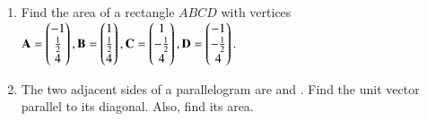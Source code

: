 \begin{enumerate}[label=\arabic*.,ref=\thesubsection.\theenumi]
\item Find the area of a rectangle $ABCD$ with vertices
$\mathbf{A} = \begin{pmatrix}-1\\\frac{1}{2}\\ 4\end{pmatrix},
 \mathbf{B} = \begin{pmatrix}1\\\frac{1}{2}\\ 4\end{pmatrix},
\mathbf{C} = \begin{pmatrix}1\\-\frac{1}{2}\\ 4\end{pmatrix},
\mathbf{D} = \begin{pmatrix}-1\\-\frac{1}{2}\\ 4\end{pmatrix}.
$
\item The two adjacent sides of a parallelogram are  and  . Find the unit vector parallel to its diagonal.  Also, find its area.
%
%
\end{enumerate}
%

